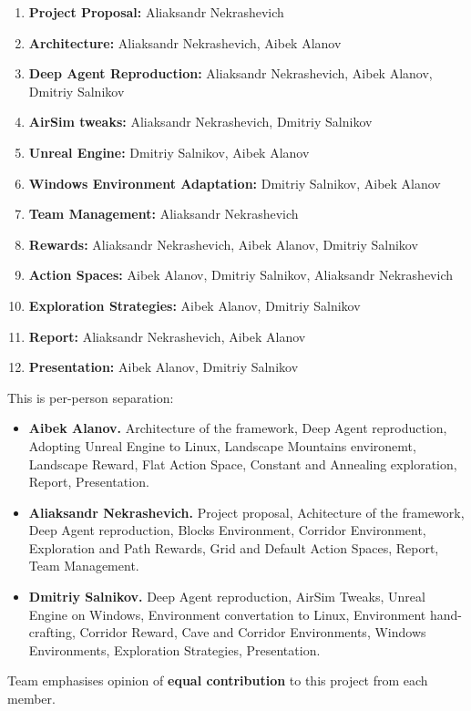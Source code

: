 \documentclass{article}
\begin{document}
\begin{enumerate}
    \item {\bf Project Proposal:} Aliaksandr Nekrashevich
    \item {\bf Architecture:} Aliaksandr Nekrashevich, Aibek Alanov
    \item {\bf Deep Agent Reproduction:} Aliaksandr Nekrashevich, Aibek Alanov, Dmitriy Salnikov
    \item {\bf AirSim tweaks:} Aliaksandr Nekrashevich, Dmitriy Salnikov
    \item {\bf Unreal Engine:} Dmitriy Salnikov, Aibek Alanov
    \item {\bf Windows Environment Adaptation:} Dmitriy Salnikov, Aibek Alanov
    \item {\bf Team Management:} Aliaksandr Nekrashevich
    \item {\bf Rewards:} Aliaksandr Nekrashevich, Aibek Alanov, Dmitriy Salnikov
    \item {\bf Action Spaces:} Aibek Alanov, Dmitriy Salnikov, Aliaksandr Nekrashevich
    \item {\bf Exploration Strategies:} Aibek Alanov, Dmitriy Salnikov
    \item {\bf Report:} Aliaksandr Nekrashevich, Aibek Alanov
    \item {\bf Presentation:} Aibek Alanov, Dmitriy Salnikov
\end{enumerate}

This is per-person separation:

\begin{itemize}
    \item {\bf Aibek Alanov.} Architecture of the framework, Deep Agent reproduction,
        Adopting Unreal Engine to Linux, Landscape Mountains environemt,
        Landscape Reward, Flat Action Space, Constant and Annealing exploration,
        Report, Presentation.

    \item {\bf Aliaksandr Nekrashevich.} Project proposal, Achitecture of
        the framework, Deep Agent reproduction, Blocks Environment,
        Corridor Environment, Exploration and Path Rewards,
        Grid and Default Action Spaces, Report, Team Management.

    \item {\bf Dmitriy Salnikov.} Deep Agent reproduction, AirSim Tweaks,
        Unreal Engine on Windows, Environment convertation to Linux,
        Environment hand-crafting, Corridor Reward, Cave and Corridor
        Environments, Windows Environments, Exploration Strategies,
        Presentation.
\end{itemize}

Team emphasises opinion of {\bf equal contribution} to this project from
each member.



\end{document}
